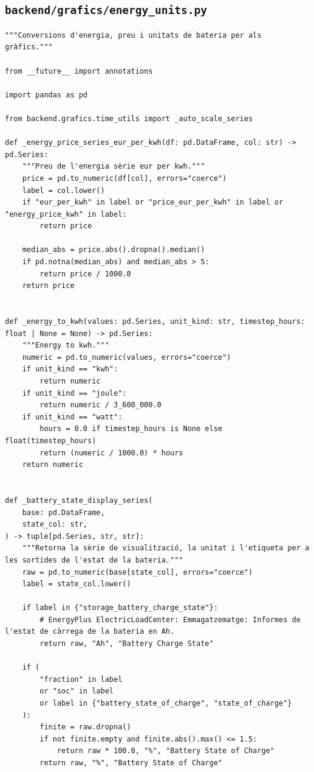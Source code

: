 \documentclass[10pt,a4paper]{article}
\begin{document}

\subsection{\texorpdfstring{\texttt{backend/grafics/energy\_units.py}}{backend/grafics/energy\_units.py}}

\begin{lstlisting}[style=studioPython,caption={backend/grafics/energy\_units.py},label={lst:backend-grafics-energy-units-py}]
"""Conversions d'energia, preu i unitats de bateria per als gràfics."""

from __future__ import annotations

import pandas as pd

from backend.grafics.time_utils import _auto_scale_series

def _energy_price_series_eur_per_kwh(df: pd.DataFrame, col: str) -> pd.Series:
    """Preu de l'energia sèrie eur per kwh."""
    price = pd.to_numeric(df[col], errors="coerce")
    label = col.lower()
    if "eur_per_kwh" in label or "price_eur_per_kwh" in label or "energy_price_kwh" in label:
        return price

    median_abs = price.abs().dropna().median()
    if pd.notna(median_abs) and median_abs > 5:
        return price / 1000.0
    return price


def _energy_to_kwh(values: pd.Series, unit_kind: str, timestep_hours: float | None = None) -> pd.Series:
    """Energy to kwh."""
    numeric = pd.to_numeric(values, errors="coerce")
    if unit_kind == "kwh":
        return numeric
    if unit_kind == "joule":
        return numeric / 3_600_000.0
    if unit_kind == "watt":
        hours = 0.0 if timestep_hours is None else float(timestep_hours)
        return (numeric / 1000.0) * hours
    return numeric


def _battery_state_display_series(
    base: pd.DataFrame,
    state_col: str,
) -> tuple[pd.Series, str, str]:
    """Retorna la sèrie de visualització, la unitat i l'etiqueta per a les sortides de l'estat de la bateria."""
    raw = pd.to_numeric(base[state_col], errors="coerce")
    label = state_col.lower()

    if label in {"storage_battery_charge_state"}:
        # EnergyPlus ElectricLoadCenter: Emmagatzematge: Informes de l'estat de càrrega de la bateria en Ah.
        return raw, "Ah", "Battery Charge State"

    if (
        "fraction" in label
        or "soc" in label
        or label in {"battery_state_of_charge", "state_of_charge"}
    ):
        finite = raw.dropna()
        if not finite.empty and finite.abs().max() <= 1.5:
            return raw * 100.0, "%", "Battery State of Charge"
        return raw, "%", "Battery State of Charge"


\end{lstlisting}
\end{document}
